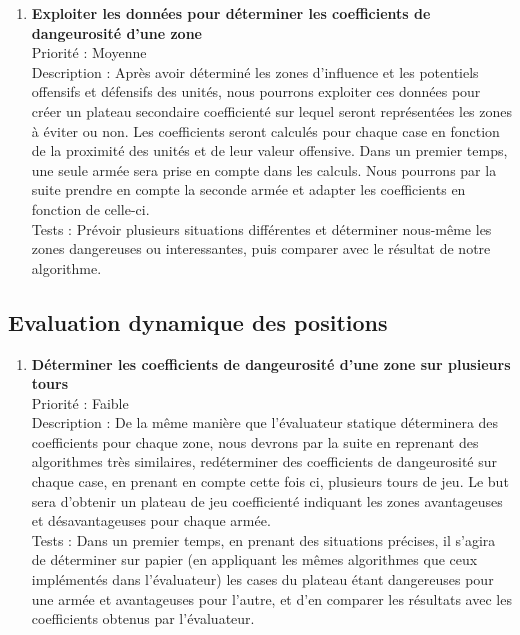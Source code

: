 \begin{enumerate}
				\item \textbf{Exploiter les données pour déterminer les coefficients de dangeurosité d'une zone} 
				\\[0.7\baselineskip]
				Priorité : Moyenne 
				\\[0.7\baselineskip]
				Description : Après avoir déterminé les zones d'influence et les potentiels offensifs et défensifs des unités, nous pourrons exploiter ces données pour 
				créer un plateau secondaire coefficienté sur lequel seront représentées les zones à éviter ou non. Les coefficients seront calculés pour chaque case en 
				fonction de la proximité des unités et de leur valeur offensive. Dans un premier temps, une seule armée sera prise en compte dans les calculs. Nous pourrons 
				par la suite prendre en compte la seconde armée et adapter les coefficients en fonction de celle-ci. 
				\\[0.7\baselineskip]
				Tests : Prévoir plusieurs situations différentes et déterminer nous-même les zones dangereuses ou interessantes, puis comparer 
				avec le résultat de notre algorithme. 
				\\[0.7\baselineskip]
				
			\end{enumerate}

		\subsection{Evaluation dynamique des positions}

			\begin{enumerate}

				\item \textbf{Déterminer les coefficients de dangeurosité d'une zone sur plusieurs tours} 
				\\[0.7\baselineskip]
				Priorité : Faible 
				\\[0.7\baselineskip]
				Description : De la même manière que l'évaluateur statique déterminera des coefficients pour chaque zone, nous devrons par la suite en reprenant des 
				algorithmes très similaires, redéterminer des coefficients de dangeurosité sur chaque case, en prenant en compte cette fois ci, plusieurs tours de jeu. 
				Le but sera d'obtenir un plateau de jeu coefficienté indiquant les zones avantageuses et désavantageuses pour chaque armée. 
				\\[0.7\baselineskip]
				Tests : Dans un premier temps, en prenant des situations précises, il s'agira de déterminer sur papier (en appliquant les mêmes algorithmes que ceux 
				implémentés dans l'évaluateur) les cases du plateau étant dangereuses pour une armée et avantageuses pour l'autre, et d'en comparer les résultats avec 
				les coefficients obtenus par l'évaluateur. 
				\\[0.7\baselineskip]
				
			\end{enumerate}


